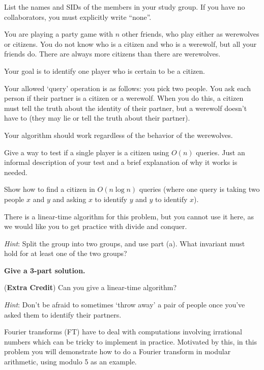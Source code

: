 \documentclass{article}
\begin{document}
List the names and SIDs of the members in your study group.
If you have no collaborators, you must explicitly write “none”.

You are playing a party game with $n$ other friends, who play either as werewolves or citizens.
You do not know who is a citizen and who is a werewolf, but all your friends do.
There are always more citizens than there are werewolves.

Your goal is to identify one player who is certain to be a citizen.

Your allowed `query' operation is as follows: you pick two people. You ask each person if their partner is a citizen or a werewolf.
When you do this, a citizen must tell the truth about the identity of their partner,
but a werewolf doesn't have to (they may lie or tell the truth about their partner).

Your algorithm should work regardless of the behavior of the werewolves.

\begin{subparts}
	\subpart Give a way to test if a single player is a citizen using $O(n)$ queries. Just an informal description of your test and a brief explanation of why it works is needed.
	
	\subpart Show how to find a citizen in $O(n\log n)$ queries (where one query is taking two people $x$ and $y$ and asking $x$ to identify $y$ and $y$ to identify $x$).

	There is a linear-time algorithm for this problem, but you cannot use it here, as we would like you to get practice with divide and conquer.
	
	\textit{Hint}: Split the group into two groups, and use part (a). What invariant must hold for at least one of the two groups?

	\textbf{Give a 3-part solution.}

	\subpart (\textbf{Extra Credit}) Can you give a linear-time algorithm?

	\textit{Hint}: Don't be afraid to sometimes `throw away' a pair of people once you've asked them to identify their partners.

\end{subparts}


Fourier transforms (FT) have to deal with computations involving irrational numbers which can be tricky to implement in practice.
Motivated by this, in this problem you will demonstrate how to do a Fourier transform in modular arithmetic,
using modulo 5 as an example. 
\end{document}
